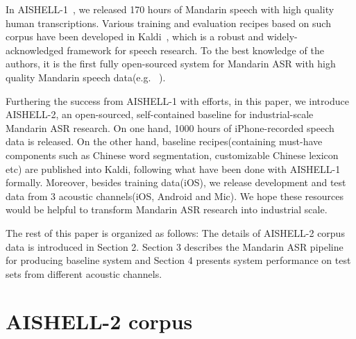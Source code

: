 \documentclass[a4paper]{article}
\begin{document}
In AISHELL-1~\cite{aishell1}, we released 170 hours of Mandarin speech with high quality human transcriptions. 
Various training and evaluation recipes based on such corpus have been developed in Kaldi~\cite{kaldi}, which is a robust and widely-acknowledged framework for speech research. 
To the best knowledge of the authors, it is the first fully open-sourced system for Mandarin ASR with high quality Mandarin speech data(e.g. ~\cite{do2017, do2018_1, do2018_2}).

Furthering the success from AISHELL-1 with efforts, in this paper, we introduce AISHELL-2, an open-sourced, self-contained baseline for industrial-scale Mandarin ASR research. 
On one hand, 1000 hours of iPhone-recorded speech data is released. On the other hand, baseline recipes(containing must-have components such as Chinese word segmentation, customizable Chinese lexicon etc) are published into Kaldi, following what have been done with AISHELL-1 formally.
Moreover, besides training data(iOS), we release development and test data from 3 acoustic channels(iOS, Android and Mic).
We hope these resources would be helpful to transform Mandarin ASR research into industrial scale.

The rest of this paper is organized as follows: The details of AISHELL-2 corpus data is introduced in Section 2. 
Section 3 describes the Mandarin ASR pipeline for producing baseline system and Section 4 
presents system performance on test sets from different acoustic channels.

\section{AISHELL-2 corpus}
\end{document}
